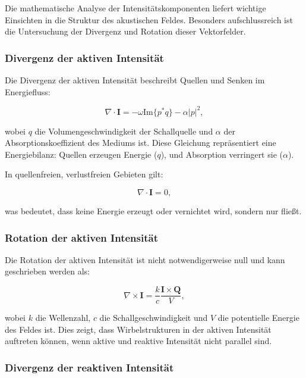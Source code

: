 Die mathematische Analyse der Intensitätskomponenten liefert wichtige Einsichten in die Struktur des akustischen Feldes. Besonders aufschlussreich ist die Untersuchung der Divergenz und Rotation dieser Vektorfelder.

\subsubsection{Divergenz der aktiven Intensität}

Die Divergenz der aktiven Intensität beschreibt Quellen und Senken im Energiefluss:

\begin{equation}
\nabla \cdot \mathbf{I} = -\omega\text{Im}\{p^*q\} - \alpha|p|^2,
\end{equation}

\noindent wobei $q$ die Volumengeschwindigkeit der Schallquelle und $\alpha$ der Absorptionskoeffizient des Mediums ist. Diese Gleichung repräsentiert eine Energiebilanz: Quellen erzeugen Energie ($q$), und Absorption verringert sie ($\alpha$).

In quellenfreien, verlustfreien Gebieten gilt:

\begin{equation}
\nabla \cdot \mathbf{I} = 0,
\end{equation}

\noindent was bedeutet, dass keine Energie erzeugt oder vernichtet wird, sondern nur fließt.

\subsubsection{Rotation der aktiven Intensität}

Die Rotation der aktiven Intensität ist nicht notwendigerweise null und kann geschrieben werden als:

\begin{equation}
\nabla \times \mathbf{I} = \frac{k}{c} \frac{\mathbf{I} \times \mathbf{Q}}{V},
\end{equation}

\noindent wobei $k$ die Wellenzahl, $c$ die Schallgeschwindigkeit und $V$ die potentielle Energie des Feldes ist. Dies zeigt, dass Wirbelstrukturen in der aktiven Intensität auftreten können, wenn aktive und reaktive Intensität nicht parallel sind.

\subsubsection{Divergenz der reaktiven Intensität}

